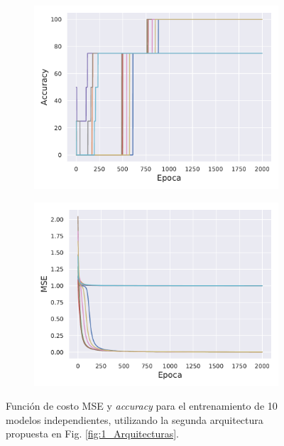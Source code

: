 \begin{figure}[h!]
    \centering
    \begin{subfigure}[h]{0.49\textwidth} 
        \includegraphics[width=\textwidth]{Figuras/ej1_2daArquitectura/Acc.pdf}
    \end{subfigure}       
    \begin{subfigure}[h]{0.49\textwidth} 
        \includegraphics[width=\textwidth]{Figuras/ej1_2daArquitectura/Loss.pdf}
    \end{subfigure}
    \caption{Función de costo MSE y \textit{accuracy} para el entrenamiento de 10 modelos independientes, utilizando la segunda arquitectura propuesta en Fig. \ref{fig:1_Arquitecturas}.} \label{fig:1_2daArquitectura}
\end{figure}

